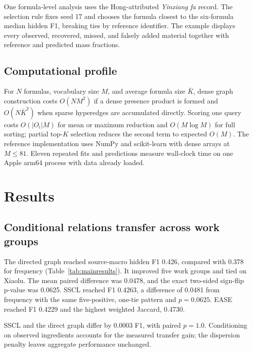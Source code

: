 \documentclass[11pt,a4paper]{article}
\newcommand{\SSCL}{\textsc{SSCL}}
\begin{document}
One formula-level analysis uses the Hong-attributed \emph{Yinxiang fa} record. The selection rule fixes seed 17 and chooses the formula closest to the six-formula median hidden F1, breaking ties by reference identifier. The example displays every observed, recovered, missed, and falsely added material together with reference and predicted mass fractions.

\subsection{Computational profile}

For $N$ formulas, vocabulary size $M$, and average formula size $\bar K$, dense graph construction costs $O(NM^2)$ if a dense presence product is formed and $O(N\bar K^2)$ when sparse hyperedges are accumulated directly. Scoring one query costs $O(|O_i|M)$ for mean or maximum reduction and $O(M\log M)$ for full sorting; partial top-$K$ selection reduces the second term to expected $O(M)$. The reference implementation uses NumPy and scikit-learn \citep{pedregosa2011_scikit} with dense arrays at $M\leq81$. Eleven repeated fits and predictions measure wall-clock time on one Apple arm64 process with data already loaded.

\section{Results}

\subsection{Conditional relations transfer across work groups}

The directed graph reached source-macro hidden F1 0.426, compared with 0.378 for frequency (Table~\ref{tab:mainresults}). It improved five work groups and tied on Xiaolu. The mean paired difference was 0.0478, and the exact two-sided sign-flip p-value was 0.0625. \SSCL{} reached F1 0.4263, a difference of 0.0481 from frequency with the same five-positive, one-tie pattern and $p=0.0625$. EASE reached F1 0.4229 and the highest weighted Jaccard, 0.4730.

\SSCL{} and the direct graph differ by 0.0003 F1, with paired $p=1.0$. Conditioning on observed ingredients accounts for the measured transfer gain; the dispersion penalty leaves aggregate performance unchanged.
\end{document}

